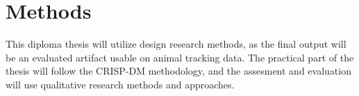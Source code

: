 \chapter{Methods}

This diploma thesis will utilize design research methods, as the final output will be an evaluated artifact usable on animal tracking data. The practical part of the thesis will follow the CRISP-DM methodology, and the assesment and evaluation will use qualitative research methods and approaches.